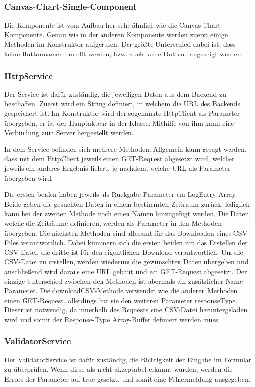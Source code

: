\subsubsection{Canvas-Chart-Single-Component}
Die Komponente ist vom Aufbau her sehr ähnlich wie die Canvas-Chart-Komponente. Genau wie in der anderen Komponente werden zuerst einige Methoden im Konstruktor aufgerufen. Der größte Unterschied dabei ist, dass keine Buttonnamen erstellt werden, bzw. auch keine Buttons angezeigt werden.
 
\subsubsection{HttpService}
Der Service ist dafür zuständig, die jeweiligen Daten aus dem Backend zu beschaffen. Zuerst wird ein String definiert, in welchem die URL des Backends gespeichert ist. Im Konstruktor wird der sogenannte HttpClient als Parameter übergeben, er ist der Hauptakteur in der Klasse. Mithilfe von ihm kann eine Verbindung zum Server hergestellt werden.
 
In dem Service befinden sich mehrere Methoden. Allgemein kann gesagt werden, dass mit dem HttpClient jeweils einen GET-Request abgesetzt wird, welcher jeweils ein anderes Ergebnis liefert, je nachdem, welche URL als Parameter übergeben wird.
 
Die ersten beiden haben jeweils als Rückgabe-Parameter ein LogEntry Array. Beide geben die gesuchten Daten in einem bestimmten Zeitraum zurück, lediglich kann bei der zweiten Methode noch einen Namen hinzugefügt werden. Die Daten, welche die Zeiträume definieren, werden als Parameter in den Methoden übergeben. Die nächsten Methoden sind allesamt für das Downloaden eines CSV-Files verantwortlich. Dabei kümmern sich die ersten beiden um das Erstellen der CSV-Datei, die dritte ist für den eigentlichen Download verantwortlich. Um die CSV-Datei zu erstellen, werden wiederum die gewünschten Daten übergeben und anschließend wird daraus eine URL gebaut und ein GET-Request abgesetzt. Der einzige Unterschied zwischen den Methoden ist abermals ein zusätzlicher Name-Parameter. Die downloadCSV-Methode verwendet wie die anderen Methoden einen GET-Request, allerdings hat sie den weiteren Parameter responseType. Dieser ist notwendig, da innerhalb des Requests eine CSV-Datei heruntergeladen wird und somit der Response-Type Array-Buffer definiert werden muss.
 
\subsubsection{ValidatorService}
Der ValidatorService ist dafür zuständig, die Richtigkeit der Eingabe im Formular zu überprüfen. Wenn diese als nicht akzeptabel erkannt wurden, werden die Errors der Parameter auf true gesetzt, und somit eine Fehlermeldung ausgegeben.
 
